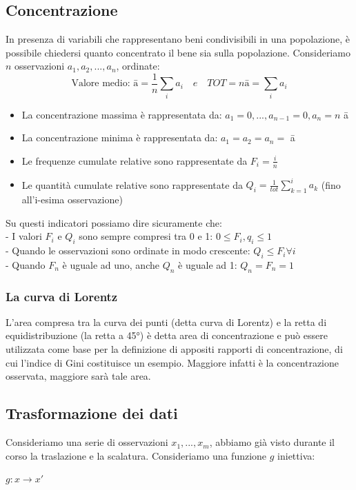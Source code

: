 \subsection{Concentrazione}
In presenza di variabili che rappresentano beni condivisibili in una popolazione, è possibile chiedersi quanto concentrato il bene sia sulla popolazione.
Consideriamo $n$ osservazioni $a_1, a_2, ..., a_n$, ordinate: 
\begin{equation*}
\text{Valore medio: \={a}} = \frac{1}{n} \sum_i a_i \quad e \quad TOT = n\text{\={a}} = \sum_i a_i
\end{equation*}
\begin{itemize}
\item La concentrazione massima è rappresentata da: $ a_1 = 0, ..., a_{n-1} = 0, a_n = n $ \={a} 
\item La concentrazione minima è rappresentata da: $a_1 = a_2 = a_n =$ \={a}
\item Le frequenze cumulate relative sono rappresentate da $F_i = \frac{i}{n}$
\item Le quantità cumulate relative sono rappresentate da $Q_i = \frac{1}{tot} \sum_{k=1}^i a_k$ (fino all'i-esima osservazione)
\end{itemize}
Su questi indicatori possiamo dire sicuramente che:\\
- I valori $F_i$ e $Q_i$ sono sempre compresi tra 0 e 1: $0 \leq F_i, q_i \leq 1$  \\
- Quando le osservazioni sono ordinate in modo crescente: $Q_i \leq F_i \forall i$ \\
- Quando $F_n$ è uguale ad uno, anche $Q_n$ è uguale ad 1: $Q_n = F_n = 1$

\subsubsection{La curva di Lorentz}
L'area compresa tra la curva dei punti (detta curva di Lorentz) e la retta di equidistribuzione (la retta a 45°) è detta area di concentrazione e può essere utilizzata come base per la definizione di appositi rapporti di concentrazione, di cui l'indice di Gini costituisce un esempio. Maggiore infatti è la concentrazione osservata, maggiore sarà tale area.

\subsection{Trasformazione dei dati}
Consideriamo una serie di osservazioni $x_1, ..., x_m$, abbiamo già visto durante il corso la traslazione e la scalatura.
Consideriamo una funzione $g$ iniettiva:\begin{center}
$g: x \rightarrow x'$
\end{center}
